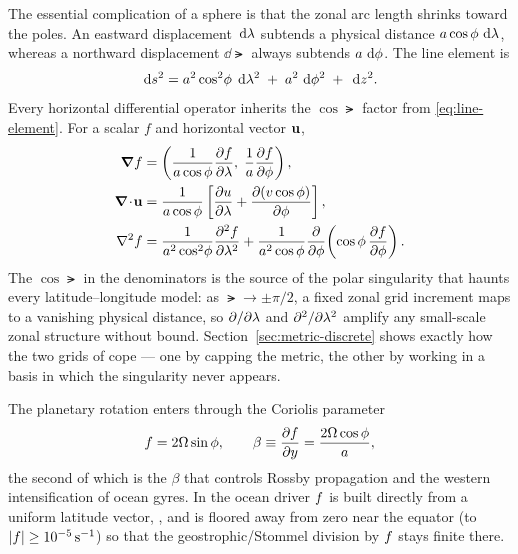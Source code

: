 The essential complication of a sphere is that the zonal arc length shrinks toward the poles.
An eastward displacement $\,\mathrm{d}\lambda$ subtends a physical distance $a\cos\phi\,\,\mathrm{d}\lambda$, whereas
a northward displacement $\dd\lat$ always subtends $a\,\,\mathrm{d}\phi$. The line element is
\begin{equation}
  \,\mathrm{d} s^2 = a^2\cos^2\!\phi\;\,\mathrm{d}\lambda^2 \;+\; a^2\,\,\mathrm{d}\phi^2 \;+\; \,\mathrm{d} z^2 .
  \label{eq:line-element}
\end{equation}
Every horizontal differential operator inherits the $\cos\lat$ factor from
\eqref{eq:line-element}. For a scalar $f$ and horizontal vector $\mathbf{u}$,
\begin{align}
  \boldsymbol{\nabla} f &= \left(\frac{1}{a\cos\phi}\frac{\partial f}{\partial \lambda},\;\frac{1}{a}\frac{\partial f}{\partial \phi}\right),
  \label{eq:sph-grad}\\
  \boldsymbol{\nabla}\!\cdot\!\mathbf{u} &= \frac{1}{a\cos\phi}\left[\frac{\partial u}{\partial \lambda}
     + \frac{\partial (v\cos\phi)}{\partial \phi}\right],
  \label{eq:sph-div}\\
  \nabla^{2} f &= \frac{1}{a^2\cos^2\!\phi}\frac{\partial^2 f}{\partial \lambda^2}
     + \frac{1}{a^2\cos\phi}\frac{\partial }{\partial \phi}\!\left(\cos\phi\,\frac{\partial f}{\partial \phi}\right).
  \label{eq:sph-lap}
\end{align}
The $\cos\lat$ in the denominators is the source of the polar singularity that haunts every
latitude--longitude model: as $\lat\to\pm\pi/2$, a fixed zonal grid increment maps to a vanishing
physical distance, so $\partial/\partial\lambda$ and $\partial^2/\partial\lambda^2$ amplify any
small-scale zonal structure without bound. Section~\ref{sec:metric-discrete} shows exactly how
the two grids of \model{} cope --- one by capping the metric, the other by working in a basis in
which the singularity never appears.

The planetary rotation enters through the Coriolis parameter
\begin{equation}
  f = 2\Omega\sin\phi, \qquad \beta \equiv \frac{\partial f}{\partial y} = \frac{2\Omega\cos\phi}{a},
  \label{eq:coriolis}
\end{equation}
the second of which is the $\beta$ that controls Rossby propagation and the western
intensification of ocean gyres. In the ocean driver $f$ is built directly from a uniform
latitude vector, , and is floored away from zero near the
equator (to $|f|\ge 10^{-5}\,\mathrm{s^{-1}}$) so that the geostrophic/Stommel division by
$f$ stays finite there.



